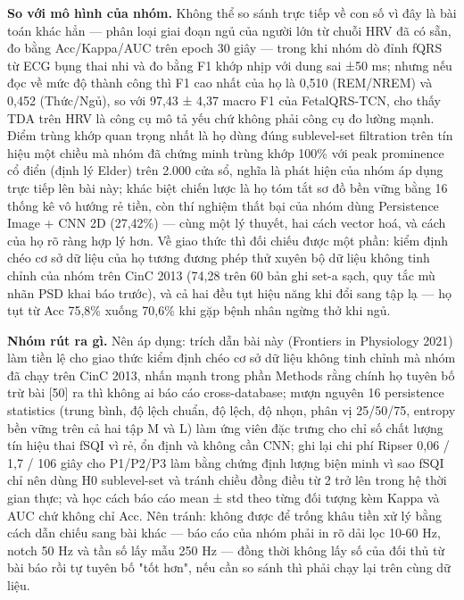 \documentclass[12pt,a4paper]{article}
\begin{document}
\noindent \textbf{\color{tdtblue}So với mô hình của nhóm.} Không thể so sánh trực tiếp về con số vì đây là bài toán khác hẳn — phân loại giai đoạn ngủ của người lớn từ chuỗi HRV đã có sẵn, đo bằng Acc/Kappa/AUC trên epoch 30 giây — trong khi nhóm dò đỉnh fQRS từ ECG bụng thai nhi và đo bằng F1 khớp nhịp với dung sai ±50 ms; nhưng nếu đọc về mức độ thành công thì F1 cao nhất của họ là 0,510 (REM/NREM) và 0,452 (Thức/Ngủ), so với 97,43 ± 4,37 macro F1 của FetalQRS-TCN, cho thấy TDA trên HRV là công cụ mô tả yếu chứ không phải công cụ đo lường mạnh. Điểm trùng khớp quan trọng nhất là họ dùng đúng sublevel-set filtration trên tín hiệu một chiều mà nhóm đã chứng minh trùng khớp 100\% với peak prominence cổ điển (định lý Elder) trên 2.000 cửa sổ, nghĩa là phát hiện của nhóm áp dụng trực tiếp lên bài này; khác biệt chiến lược là họ tóm tắt sơ đồ bền vững bằng 16 thống kê vô hướng rẻ tiền, còn thí nghiệm thất bại của nhóm dùng Persistence Image + CNN 2D (27,42\%) — cùng một lý thuyết, hai cách vector hoá, và cách của họ rõ ràng hợp lý hơn. Về giao thức thì đối chiếu được một phần: kiểm định chéo cơ sở dữ liệu của họ tương đương phép thử xuyên bộ dữ liệu không tinh chỉnh của nhóm trên CinC 2013 (74,28 trên 60 bản ghi set-a sạch, quy tắc mù nhãn PSD khai báo trước), và cả hai đều tụt hiệu năng khi đổi sang tập lạ — họ tụt từ Acc 75,8\% xuống 70,6\% khi gặp bệnh nhân ngừng thở khi ngủ.\par\vspace{3pt}
\noindent \textbf{\color{tdtblue}Nhóm rút ra gì.} Nên áp dụng: trích dẫn bài này (Frontiers in Physiology 2021) làm tiền lệ cho giao thức kiểm định chéo cơ sở dữ liệu không tinh chỉnh mà nhóm đã chạy trên CinC 2013, nhấn mạnh trong phần Methods rằng chính họ tuyên bố trừ bài [50] ra thì không ai báo cáo cross-database; mượn nguyên 16 persistence statistics (trung bình, độ lệch chuẩn, độ lệch, độ nhọn, phân vị 25/50/75, entropy bền vững trên cả hai tập M và L) làm ứng viên đặc trưng cho chỉ số chất lượng tín hiệu thai fSQI vì rẻ, ổn định và không cần CNN; ghi lại chi phí Ripser 0,06 / 1,7 / 106 giây cho P1/P2/P3 làm bằng chứng định lượng biện minh vì sao fSQI chỉ nên dùng H0 sublevel-set và tránh chiều đồng điều từ 2 trở lên trong hệ thời gian thực; và học cách báo cáo mean ± std theo từng đối tượng kèm Kappa và AUC chứ không chỉ Acc. Nên tránh: không được để trống khâu tiền xử lý bằng cách dẫn chiếu sang bài khác — báo cáo của nhóm phải in rõ dải lọc 10-60 Hz, notch 50 Hz và tần số lấy mẫu 250 Hz — đồng thời không lấy số của đối thủ từ bài báo rồi tự tuyên bố "tốt hơn", nếu cần so sánh thì phải chạy lại trên cùng dữ liệu.\par\vspace{3pt}
\vspace{6pt}
\end{document}
